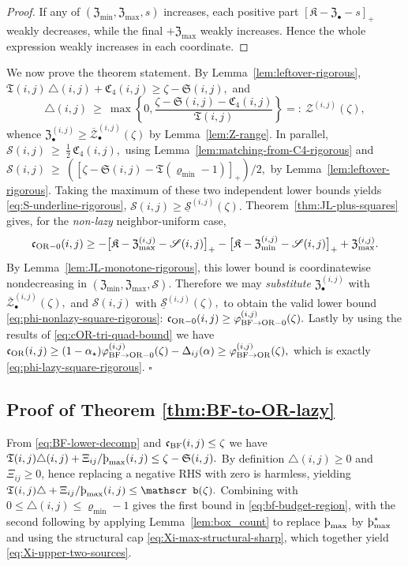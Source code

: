\documentclass[twoside,11pt]{article}
\numberwithin{equation}{section}
\numberwithin{theorem}{section}
\numberwithin{example}{section}
\newcommand{\sho}{\textup{\text{\th}}}
\begin{document}
\begin{proof}
If any of $(\mathfrak Z_{\min},\mathfrak Z_{\max},s)$ increases, each positive part $[\mathfrak K-\mathfrak Z_{\bullet}-s]_+$ weakly decreases, while the final $+\mathfrak Z_{\max}$ weakly increases. Hence the whole expression weakly increases in each coordinate.
\end{proof}
We now prove the theorem statement. By Lemma~\ref{lem:leftover-rigorous}, 
\(\mathfrak T(i,j)\,\triangle(i,j)+\mathfrak C_4(i,j)\ge \zeta-\mathfrak S(i,j),
\)
and
\[
\triangle(i,j)\ \ge\ \max\!\left\{0,\frac{\zeta-\mathfrak S(i,j)-\mathfrak C_4(i,j)}{\mathfrak T(i,j)}\right\}
=:\ \mathscr Z^{(i,j)}(\zeta),
\]
whence $\mathfrak Z_{\bullet}^{(i,j)}\ge \overline{\mathscr Z}^{(i,j)}_{\bullet}(\zeta)$ by Lemma~\ref{lem:Z-range}. In parallel,
\(
\mathscr S(i,j)\ \ge\ \frac12\,\mathfrak C_4(i,j),\)
using Lemma~\ref{lem:matching-from-C4-rigorous} and
\(
\mathscr S(i,j)\ \ge\ \left(\left[\zeta-\mathfrak S(i,j)-\mathfrak T(\varrho_{\min}-1)\right]_+\right)/2,
\)
by Lemma~\ref{lem:leftover-rigorous}. Taking the maximum of these two independent lower bounds yields \eqref{eq:S-underline-rigorous},
\(
\mathscr S(i,j)\ge \underline{\mathscr S}^{(i,j)}(\zeta).
\)
Theorem~\ref{thm:JL-plus-squares} gives, for the \emph{non-lazy} neighbor-uniform case,
\[
\mathfrak c_{\rm OR-0}(i,j) \ge
-\bigl[\mathfrak K-\mathfrak Z_{\max}^{(i,j)}-\mathscr S(i,j)\bigr]_+
-\bigl[\mathfrak K-\mathfrak Z_{\min}^{(i,j)}-\mathscr S(i,j)\bigr]_+
+\mathfrak Z_{\max}^{(i,j)}.
\]
By Lemma~\ref{lem:JL-monotone-rigorous}, this lower bound is coordinatewise nondecreasing in $(\mathfrak Z_{\min},\mathfrak Z_{\max},\mathscr S)$. Therefore we may \emph{substitute}
\(
\mathfrak Z_{\bullet}^{(i,j)}\) with \(\overline{\mathscr Z}^{(i,j)}_{\bullet}(\zeta),
\) and \(
\mathscr S(i,j)\) with \(\underline{\mathscr S}^{(i,j)}(\zeta),
\)
to obtain the valid lower bound \eqref{eq:phi-nonlazy-square-rigorous}:
\(
\mathfrak c_{\rm OR-0}(i,j)\ge \varphi^{(i,j)}_{\rm BF\to OR-0}(\zeta).
\)
Lastly by using the results of \eqref{eq:cOR-tri-quad-bound} we have
\(\mathfrak c_{\rm OR}(i,j) \ge (1-\alpha_\star)\varphi^{(i,j)}_{\rm BF\to OR-0}(\zeta) - \Delta_{ij}(\alpha)
 \ge \varphi^{(i,j)}_{\rm BF\to OR}(\zeta),
\)
which is exactly \eqref{eq:phi-lazy-square-rigorous}.
\hfill $\square$

\subsection{Proof of Theorem \ref{thm:BF-to-OR-lazy}}
From \eqref{eq:BF-lower-decomp} and $\mathfrak c_{\rm BF}(i,j)\le\zeta$ we have
\(
\mathfrak T(i,j)\triangle(i,j)+\Xi_{ij}/\sho_{\max}(i,j)\le \zeta-\mathfrak S(i,j).
\)
By definition $\triangle(i,j)\ge0$ and $\Xi_{ij}\ge 0$, hence replacing a negative RHS with zero is harmless, yielding
\(
\mathfrak T(i,j)\triangle+\Xi_{ij}/\sho_{\max}(i,j)\le \mathscr b(\zeta).
\)
Combining with $0\le \triangle(i,j)\le \varrho_{\min}-1$
gives the first bound in \eqref{eq:bf-budget-region}, with the second following by applying Lemma~\ref{lem:box_count} to replace $\sho_{\max}$ by $\sho_{\max}^\star$ and using the structural cap \eqref{eq:Xi-max-structural-sharp}, which together yield \eqref{eq:Xi-upper-two-sources}.
\end{document}
